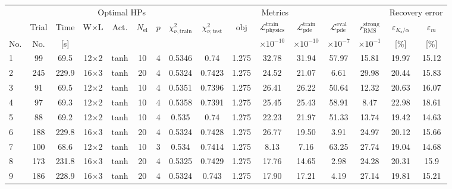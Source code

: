 \begin{tabular}{lcc cccc ccccccc cc}
\toprule
& & & \multicolumn{4}{c}{Optimal HPs} & \multicolumn{7}{c}{Metrics} & \multicolumn{2}{c}{Recovery error} \\
\cmidrule(lr){4-7}\cmidrule(lr){8-14}\cmidrule(lr){15-16}
& Trial & Time & W$\times$L & Act. & $N_{\mathrm{el}}$ & $p$ & $\chi^2_{\nu,\mathrm{train}}$ & $\chi^2_{\nu,\mathrm{test}}$ & $\mathrm{obj}$ & $\mathcal{L}_{\mathrm{physics}}^{\mathrm{train}}$ & $\mathcal{L}_{\mathrm{pde}}^{\mathrm{train}}$ & $\mathcal{L}_{\mathrm{pde}}^{\mathrm{eval}}$ & $r_{\mathrm{RMS}}^{\mathrm{strong}}$ & $\varepsilon_{K_{\mathrm{s}}/\alpha}$ & $\varepsilon_{m}$ \\
No. & No. & [s] &  &  &  &  &  &  &  & $\times 10^{-10}$ & $\times 10^{-10}$ & $\times 10^{-7}$ & $\times 10^{-1}$ & [\%] & [\%] \\
\midrule
  1 & 99 & 69.5 & 12$\times$2 & tanh & 10 & 4 & \num{0.5346} & \num{0.74} & \num{1.275} & 32.78 & 31.94 & 57.97 & 15.81 & \num{19.97} & \num{15.12} \\
  2 & 245 & 229.9 & 16$\times$3 & tanh & 20 & 4 & \num{0.5324} & \num{0.7423} & \num{1.275} & 24.52 & 21.07 & 6.61 & 29.98 & \num{20.44} & \num{15.83} \\
  3 & 91 & 69.5 & 12$\times$2 & tanh & 10 & 4 & \num{0.5351} & \num{0.7396} & \num{1.275} & 26.41 & 26.22 & 50.64 & 12.32 & \num{20.63} & \num{16.07} \\
  4 & 97 & 69.3 & 12$\times$2 & tanh & 10 & 4 & \num{0.5358} & \num{0.7391} & \num{1.275} & 25.45 & 25.43 & 58.91 & 8.47 & \num{22.98} & \num{18.61} \\
  5 & 88 & 69.2 & 12$\times$2 & tanh & 10 & 4 & \num{0.535} & \num{0.74} & \num{1.275} & 22.23 & 21.97 & 51.33 & 13.74 & \num{19.42} & \num{14.63} \\
  6 & 188 & 229.8 & 16$\times$3 & tanh & 20 & 4 & \num{0.5324} & \num{0.7428} & \num{1.275} & 26.77 & 19.50 & 3.91 & 24.97 & \num{20.12} & \num{15.66} \\
  7 & 100 & 68.6 & 12$\times$2 & tanh & 10 & 3 & \num{0.534} & \num{0.7414} & \num{1.275} & 8.13 & 7.16 & 63.25 & 27.74 & \num{19.04} & \num{14.68} \\
  8 & 173 & 231.8 & 16$\times$3 & tanh & 20 & 4 & \num{0.5325} & \num{0.7429} & \num{1.275} & 17.76 & 14.65 & 2.98 & 24.28 & \num{20.31} & \num{15.9} \\
  9 & 186 & 228.9 & 16$\times$3 & tanh & 20 & 4 & \num{0.5324} & \num{0.743} & \num{1.275} & 17.90 & 17.21 & 4.19 & 27.14 & \num{19.81} & \num{15.21} \\

\end{tabular}
